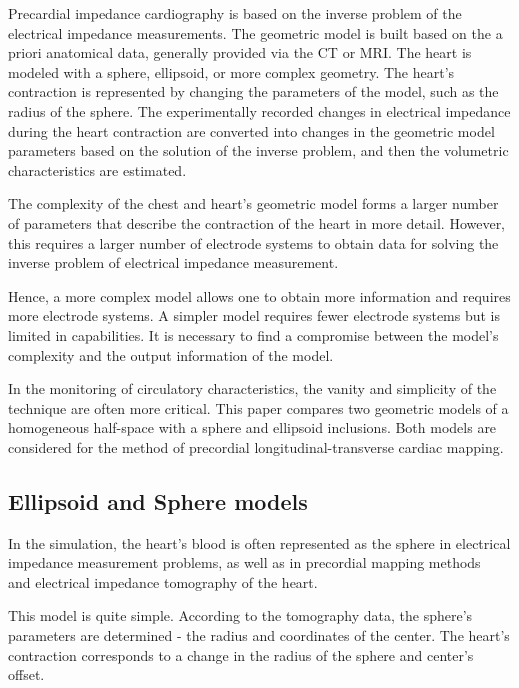 \documentclass[conference]{IEEEtran}
\begin{document}
Precardial impedance cardiography is based on the inverse problem of the
electrical impedance measurements. The geometric model is built based on the a
priori anatomical data, generally provided via the CT or MRI.
The heart is modeled with a sphere, ellipsoid, or more complex geometry. The
heart's contraction is represented by changing the parameters of the model, such
as the radius of the sphere. The experimentally recorded changes in electrical
impedance during the heart contraction are converted into changes in the
geometric model parameters based on the solution of the inverse problem, and
then the volumetric characteristics are estimated.

The complexity of the chest and heart's geometric model forms a larger number of
parameters that describe the contraction of the heart in more detail. However,
this requires a larger number of electrode systems to obtain data for solving
the inverse problem of electrical impedance measurement.

Hence, a more complex model allows one to obtain more information and requires
more electrode systems. A simpler model requires fewer electrode systems but is
limited in capabilities. It is necessary to find a compromise between the
model's complexity and the output information of the model.

In the monitoring of circulatory characteristics, the vanity and simplicity of
the technique are often more critical. This paper compares two geometric models
of a homogeneous half-space with a sphere and ellipsoid inclusions. Both models
are considered for the method of precordial longitudinal-transverse cardiac
mapping.

\subsection{Ellipsoid and Sphere models}

In the simulation, the heart's blood is often represented as the sphere in
electrical impedance measurement problems,
as well as in precordial mapping methods~\cite{Tikhomirov2019}
and electrical impedance tomography of
the heart.

This model is quite simple. According to the tomography data, the sphere's
parameters are determined - the radius and coordinates of the center. The
heart's contraction corresponds to a change in the radius of the sphere and
center's offset.
\end{document}
